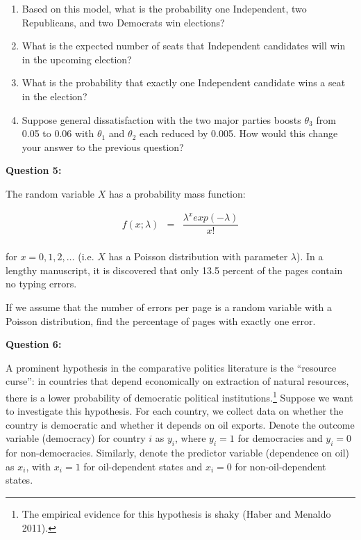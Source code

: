 \documentclass[11pt]{article}
\begin{document}
\begin{enumerate}
\item Based on this model, what is the probability one Independent, two Republicans, and two Democrats win elections?
\item What is the expected number of seats that Independent candidates will win in the upcoming election?  
\item What is the probability that exactly one Independent candidate wins a seat in the election?
\item Suppose general dissatisfaction with the two major parties boosts $\theta_3$ from 0.05 to 0.06 with $\theta_1$ and $\theta_2$ each reduced by 0.005. How would this change your answer to the previous question?
\end{enumerate}

\bigskip


\textbf{Question 5:}

The random variable $X$ has a probability mass function:

\begin{eqnarray*}
f(x; \lambda)&=&\dfrac{\lambda^x exp(- \lambda)}{x!}\\
\end{eqnarray*}

for $x = 0,1,2,\ldots$ (i.e. $X$ has a Poisson distribution with parameter $\lambda$). In a lengthy manuscript, it is discovered that only 13.5 percent of the pages contain no typing errors. 


\bigskip
If we assume that the number of errors per page is a random variable with a Poisson distribution, find the percentage of pages with exactly one error. 



\textbf{Question 6:}

A prominent hypothesis in the comparative politics literature is the ``resource curse'': in countries that depend economically on extraction of natural resources, there is a lower probability of democratic political institutions.\footnote{The empirical evidence for this hypothesis is shaky (Haber and Menaldo 2011).} Suppose we  want to investigate this hypothesis. For each country, we collect data on whether the country is democratic and whether it depends on oil exports. Denote the outcome variable (democracy) for country $i$ as $y_i$, where $y_i = 1$ for democracies and $y_i  = 0$ for non-democracies. Similarly, denote the predictor variable (dependence on oil) as $x_i$, with $x_i = 1$ for oil-dependent states and $x_i = 0$ for non-oil-dependent states.
\end{document}
